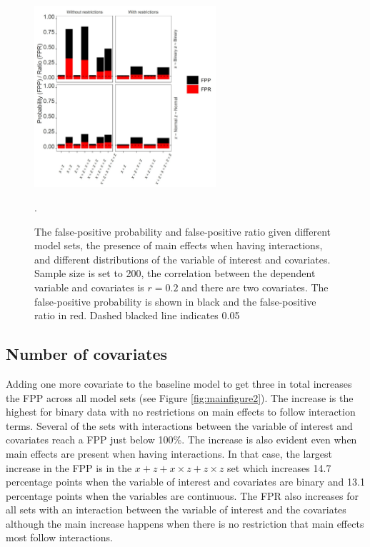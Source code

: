 \begin{figure}[hbt!]
\includegraphics[width=0.6\textwidth]{R/Analysis/Result/Figures/Figure1A.jpeg}
\centering
\caption{The false-positive probability and false-positive ratio given different model sets, the presence of main effects when having interactions, and different distributions of the variable of interest and covariates. Sample size is set to 200, the correlation between the dependent variable and covariates is $r=0.2$ and there are two covariates. The false-positive probability is shown in black and the false-positive ratio in red. Dashed blacked line indicates 0.05}.
\label{fig:mainfigure1}
\end{figure}

\subsection{Number of covariates}
Adding one more covariate to the baseline model to get three in total increases the FPP across all model sets (see Figure \ref{fig:mainfigure2}). The increase is the highest for binary data with no restrictions on main effects to follow interaction terms. Several of the sets with interactions between the variable of interest and covariates reach a FPP just below 100\%. The increase is also evident even when main effects are present when having interactions. In that case, the largest increase in the FPP is in the $x + z+ x \times z + z \times z$ set which increases 14.7 percentage points when the variable of interest and covariates are binary and 13.1 percentage points when the variables are continuous. The FPR also increases for all sets with an interaction between the variable of interest and the covariates although the main increase happens when there is no restriction that main effects most follow interactions.

